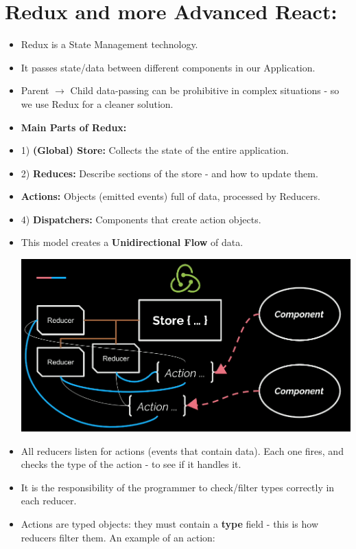 \documentclass[8pt,a4paper]{extarticle}
\begin{document}
\section{Redux and more Advanced React:}

\begin{itemize}
\item Redux is a State Management technology.
\item It passes state/data between different components in our Application. 
\item Parent $\rightarrow$ Child data-passing can be prohibitive in complex situations - so we use Redux for a cleaner solution.
\item \textbf{Main Parts of Redux:}
\item 1) \textbf{(Global) Store:} Collects the state of the entire application.
\item 2) \textbf{Reduces:} Describe sections of the store - and how to update them.
\item \textbf{Actions:} Objects (emitted events) full of data, processed by Reducers.
\item 4) \textbf{Dispatchers:} Components that create action objects.
\item This model creates a \textbf{Unidirectional Flow} of data.

\includegraphics[scale=0.25]{redux_chart.png}

\item All reducers listen for actions (events that contain data). Each one fires, and checks the type of the action - to see if it handles it.
\item It is the responsibility of the programmer to check/filter types correctly in each reducer.
\item Actions are typed objects: they must contain a \textbf{type} field - this is how reducers filter them. An example of an action:


\end{itemize}
\end{document}
